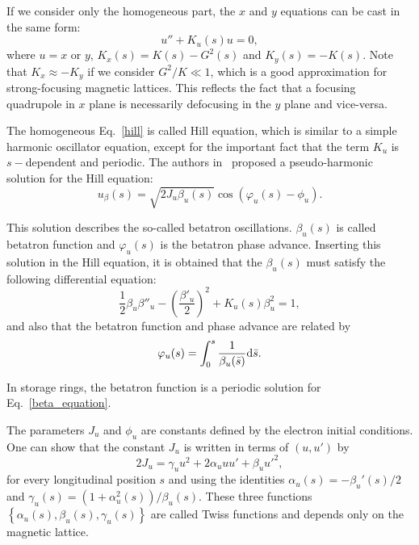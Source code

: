 If we consider only the homogeneous part, the $x$ and $y$ equations can be cast in the same form:
\begin{equation}
u'' + K_u(s) u = 0,
\label{hill}
\end{equation}
where $u = x$ or $y$, $K_x(s) = K(s) - G^2(s)$ and $K_y(s) = -K(s)$. Note that $K_x \approx -K_y$ if we consider $G^2/K \ll 1$, which is a good approximation for strong-focusing magnetic lattices. This reflects the fact that a focusing quadrupole in $x$ plane is necessarily defocusing in the $y$ plane and vice-versa. 

The homogeneous Eq.~\eqref{hill} is called Hill equation, which is similar to a simple harmonic oscillator equation, except for the important fact that the term $K_u$ is $s-$dependent and periodic. The authors in~\cite{CourantSnyder1958} proposed a pseudo-harmonic solution for the Hill equation:
\begin{equation}
    u_{\beta}(s) = \sqrt{2 J_u \beta_u (s)} \cos \left(\varphi_u(s) - \phi_u\right).
    \label{eq:beta_oscillation}
\end{equation}

This solution describes the so-called betatron oscillations. $\beta_u(s)$ is called betatron function and $\varphi_u(s)$ is the betatron phase advance. Inserting this solution in the Hill equation, it is obtained that the $\beta_u(s)$ must satisfy the following differential equation:
\begin{equation}
    \dfrac{1}{2}\beta_u {\beta''_u} -  \left(\dfrac{\beta'_u}{2}\right)^2 + K_u(s) \beta^2_u = 1,
    \label{beta_equation}
\end{equation}
and also that the betatron function and phase advance are related by
\begin{equation}
\varphi_u(s) = \int_{0}^{s} \dfrac{1}{\beta_u(\bar{s})} \mathrm{d} \bar{s}.
\end{equation}

In storage rings, the betatron function is a periodic solution for Eq.~\eqref{beta_equation}.

The parameters $J_u$ and $\phi_u$ are constants defined by the electron initial conditions. One can show that the constant $J_u$ is written in terms of $(u, u')$ by
\begin{equation}
    2J_u = \gamma_u u^2 + 2 \alpha_u u u' + \beta_u {u'}^2,
    \label{invariant}
\end{equation}
for every longitudinal position $s$ and using the identities $\alpha_u(s) = -\beta_u'(s)/2$ and $\gamma_u(s) = (1 + \alpha_u^2(s))/\beta_u(s)$. These three functions $\left\{\alpha_u(s), \beta_u(s), \gamma_u(s)\right\}$ are called Twiss functions and depends only on the magnetic lattice.

